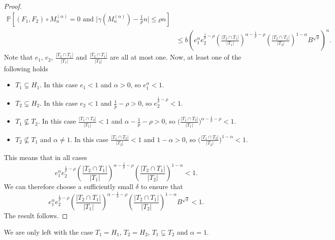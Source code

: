 \documentclass[12pt]{amsart}
\theoremstyle{definition}
\newcommand{\PPP}{\mathbb{P}}
\newcommand{\Mna}{M_{n}^{(\alpha)}}
\newcommand{\abs}[1]{\vert#1\vert}
\begin{document}
\begin{proof}
\begin{align*}
\PPP[(F_1,F_2)\circ \Mna=0 \text{ and } \abs{\gamma(\Mna)-\tfrac{1}{p}n} \leq \rho n]\\
&\leq b \left(
e_1^{\alpha} e_2^{\frac{1}{p}-\rho}
\left(\frac{\abs{T_2\cap T_1}}{\abs{T_1}}\right)^{\alpha-\frac{1}{p}-\rho}
\left(\frac{\abs{T_2\cap T_1}}{\abs{T_2}}\right)^{1-\alpha}
B^{\sqrt{\delta}}
\right)^n.
\end{align*}
Note that $e_1$, $e_2$, $\frac{\abs{T_2\cap T_1}}{\abs{T_1}}$ and $\frac{\abs{T_2\cap T_1}}{\abs{T_2}}$ are all at most one.
Now, at least one of the following holds
\begin{itemize}
    \item $T_1\subsetneq H_1$.
    In this case $e_1<1$ and $\alpha>0$, so $e_1^\alpha<1$.
    \item $T_2\subsetneq H_2$.
    In this case $e_2<1$ and $\frac{1}{p}-\rho>0$, so $e_2^{\frac{1}{p}-\rho}<1$.
    \item $T_1\not\subseteq T_2$.
    In this case $\frac{\abs{T_1\cap T_2}}{\abs{T_1}}<1$ and $\alpha-\frac{1}{p}-\rho>0$, so $\Big(\frac{\abs{T_1\cap T_2}}{\abs{T_1}}\Big)^{\alpha-\frac{1}{p}-\rho}<1$.
    \item $T_2\not\subseteq T_1$ and $\alpha\neq 1$.
    In this case $\frac{\abs{T_1\cap T_2}}{\abs{T_2}}<1$ and $1-\alpha>0$, so $\Big(\frac{\abs{T_1\cap T_2}}{\abs{T_2}}\Big)^{1-\alpha}<1$.
\end{itemize}
This means that in all cases
\[
e_1^{\alpha} e_2^{\frac{1}{p}-\rho}
\left(\frac{\abs{T_2\cap T_1}}{\abs{T_1}}\right)^{\alpha-\frac{1}{p}-\rho}
\left(\frac{\abs{T_2\cap T_1}}{\abs{T_2}}\right)^{1-\alpha}<1.
\]
We can therefore choose a sufficiently small $\delta$ to ensure that
\[
e_1^{\alpha} e_2^{\frac{1}{p}-\rho}
\left(\frac{\abs{T_2\cap T_1}}{\abs{T_1}}\right)^{\alpha-\frac{1}{p}-\rho}
\left(\frac{\abs{T_2\cap T_1}}{\abs{T_2}}\right)^{1-\alpha}
B^{\sqrt{\delta}}
<1.
\]
The result follows.
\end{proof}





We are only left with the case $T_1=H_1$, $T_2=H_2$, $T_1\subsetneq T_2$ and $\alpha=1$.
\end{document}
